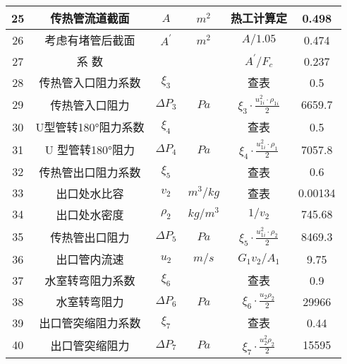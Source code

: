 \begin{table}[H]
{\begin{tabular}{|c|c|c|c|c|c|}
            25   & 传热管流道截面      & $ A $          & $ m^2 $    & 热工计算定                                               & 0.498   \\ \hline
            26   & 考虑有堵管后截面    & $ A^{'} $      & $ m^2 $    & $ A/1.05 $                                               & 0.474   \\ \hline
            27   & 系 数               &                &            & $ A^{'}/F_{c} $                                          & 0.237   \\ \hline
            28   & 传热管入口阻力系数  & $ \xi_3 $      &            & 查表                                                     & 0.5     \\ \hline
            29   & 传热管入口阻力      & $ \Delta P_3 $ & $ Pa $     & $ \xi_{3} \cdot \frac{u_{1 i}^{2} \cdot \rho_{1 i}}{2} $ & 6659.7  \\ \hline
            30   & U型管转180°阻力系数 & $ \xi_4 $      &            & 查表                                                     & 0.5     \\ \hline
            31   & U 型管转180°阻力    & $ \Delta P_4 $ & $ Pa $     & $ \xi_{4} \cdot \frac{u_{1 i}^{2} \cdot \rho_{1 }}{2} $  & 7057.8  \\ \hline
            32   & 传热管出口阻力系数  & $ \xi_5 $      &            & 查表                                                     & 0.6     \\ \hline
            33   & 出口处水比容        & $ v_2 $        & $ m^3/kg $ & 查表                                                     & 0.00134 \\ \hline
            34   & 出口处水密度        & $ \rho_2 $     & $ kg/m^3 $ & $ 1/v_2 $                                                & 745.68  \\ \hline
            35   & 传热管出口阻力      & $ \Delta P_5 $ & $ Pa $     & $ \xi_{5} \cdot \frac{u_{1 i}^{2} \cdot \rho_{2 }}{2} $  & 8469.3  \\ \hline
            36   & 出口管内流速        & $ u_2 $        & $ m/s $    & $ G_1v_2/A_1 $                                           & 9.75    \\ \hline
            37   & 水室转弯阻力系数    & $ \xi_6 $      &            & 查表                                                     & 0.9     \\ \hline
            38   & 水室转弯阻力        & $ \Delta P_6 $ & $ Pa $     & $ \xi_6 \cdot \frac{u_2 \rho_2}{2} $                     & 29966   \\ \hline
            39   & 出口管突缩阻力系数  & $ \xi_7 $      &            & 查表                                                     & 0.44    \\ \hline
            40   & 出口管突缩阻力      & $ \Delta P_7 $ & $ Pa $     & $ \xi_7 \cdot \frac{u_{2}^{2} \rho_2}{2} $               & 15595   \\ \hline
        \end{tabular}
    }
\end{table}

